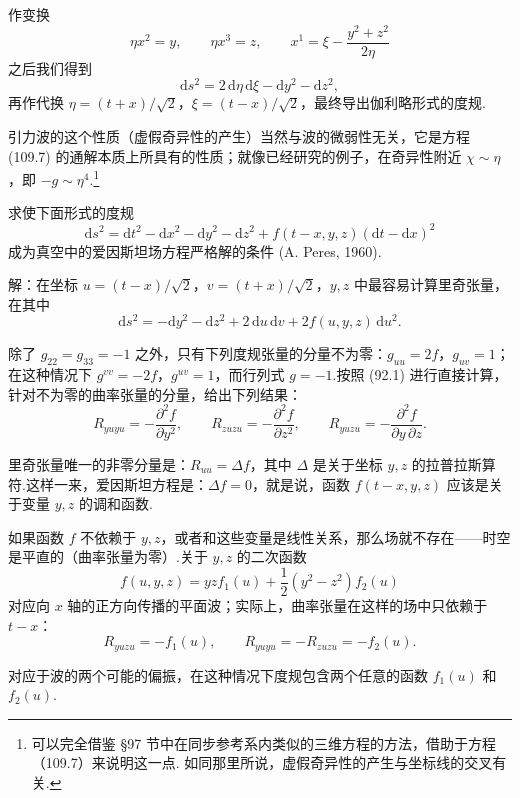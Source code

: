作变换
\begin{equation*}
  \eta x^{2}=y,\qquad
  \eta x^{3}=z,\qquad
  x^{1}=\xi-\frac{y^{2}+z^{2}}{2\eta}
\end{equation*}
之后我们得到
\begin{equation*}
  \mathrm{d}s^{2}=2\,\mathrm{d}\eta\,\mathrm{d}\xi
  -\mathrm{d}y^{2}-\mathrm{d}z^{2},
\end{equation*}
再作代换 $\eta=(t+x)/\sqrt{2}$，$\xi=(t-x)/\sqrt{2}$，最终导出伽利略形式的度规.

引力波的这个性质（虚假奇异性的产生）当然与波的微弱性无关，它是方程 (109.7) 的通解本质上所具有的性质；就像已经研究的例子，在奇异性附近 $\chi\sim\eta$，即 $-g\sim\eta^{4}$.\footnote{可以完全借鉴 §97 节中在同步参考系内类似的三维方程的方法，借助于方程（109.7）来说明这一点. 如同那里所说，虚假奇异性的产生与坐标线的交叉有关.}

\begin{xiti}

\quad 求使下面形式的度规
\begin{equation*}
  \mathrm{d}s^{2}=\mathrm{d}t^{2}-\mathrm{d}x^{2}-\mathrm{d}y^{2}-\mathrm{d}z^{2}
  +f(t-x,y,z)(\mathrm{d}t-\mathrm{d}x)^{2}
\end{equation*}
成为真空中的爱因斯坦场方程严格解的条件 (A. Peres, 1960).

解：在坐标 $u=(t-x)/\sqrt{2}$，$v=(t+x)/\sqrt{2}$，$y,z$ 中最容易计算里奇张量，在其中
\begin{equation*}
  \mathrm{d}s^{2}=-\mathrm{d}y^{2}-\mathrm{d}z^{2}
  +2\,\mathrm{d}u\,\mathrm{d}v+2f(u,y,z)\,\mathrm{d}u^{2}.
\end{equation*}

除了 $g_{22}=g_{33}=-1$ 之外，只有下列度规张量的分量不为零：$g_{uu}=2f$，$g_{uv}=1$；在这种情况下 $g^{vv}=-2f$，$g^{uv}=1$，而行列式 $g=-1$.按照 (92.1) 进行直接计算，针对不为零的曲率张量的分量，给出下列结果：
\begin{equation*}
  R_{yuyu}=-\frac{\partial^{2}f}{\partial y^{2}},
  \qquad
  R_{zuzu}=-\frac{\partial^{2}f}{\partial z^{2}},
  \qquad
  R_{yuzu}=-\frac{\partial^{2}f}{\partial y\,\partial z}.
\end{equation*}

里奇张量唯一的非零分量是：$R_{uu}=\Delta f$，其中 $\Delta$ 是关于坐标 $y,z$ 的拉普拉斯算符.这样一来，爱因斯坦方程是：$\Delta f=0$，就是说，函数 $f(t-x,y,z)$ 应该是关于变量 $y,z$ 的调和函数.

如果函数 $f$ 不依赖于 $y,z$，或者和这些变量是线性关系，那么场就不存在——时空是平直的（曲率张量为零）.关于 $y,z$ 的二次函数
\begin{equation*}
  f(u,y,z)=yzf_1(u)+\frac{1}{2}(y^{2}-z^{2})f_2(u)
\end{equation*}
对应向 $x$ 轴的正方向传播的平面波；实际上，曲率张量在这样的场中只依赖于 $t-x$：
\begin{equation*}
  R_{yuzu}=-f_1(u),
  \qquad
  R_{yuyu}=-R_{zuzu}=-f_2(u).
\end{equation*}

对应于波的两个可能的偏振，在这种情况下度规包含两个任意的函数 $f_1(u)$ 和 $f_2(u)$.

\end{xiti}
